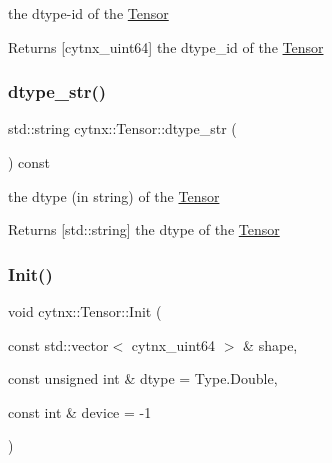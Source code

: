the dtype-\/id of the \hyperlink{classcytnx_1_1Tensor}{Tensor} 

\begin{DoxyReturn}{Returns}
\mbox{[}cytnx\+\_\+uint64\mbox{]} the dtype\+\_\+id of the \hyperlink{classcytnx_1_1Tensor}{Tensor} 
\end{DoxyReturn}
\mbox{\label{classcytnx_1_1Tensor_a9e09106c7529e8be90caa52e1541e498}} 
\subsubsection{\texorpdfstring{dtype\+\_\+str()}{dtype\_str()}}
{\footnotesize\ttfamily std\+::string cytnx\+::\+Tensor\+::dtype\+\_\+str (\begin{DoxyParamCaption}{ }\end{DoxyParamCaption}) const\hspace{0.3cm}{\ttfamily [inline]}}



the dtype (in string) of the \hyperlink{classcytnx_1_1Tensor}{Tensor} 

\begin{DoxyReturn}{Returns}
\mbox{[}std\+::string\mbox{]} the dtype of the \hyperlink{classcytnx_1_1Tensor}{Tensor} 
\end{DoxyReturn}
\mbox{\label{classcytnx_1_1Tensor_afdb4470e0dc934964d80aa9c761cca48}} 
\subsubsection{\texorpdfstring{Init()}{Init()}}
{\footnotesize\ttfamily void cytnx\+::\+Tensor\+::\+Init (\begin{DoxyParamCaption}\item[{const std\+::vector$<$ cytnx\+\_\+uint64 $>$ \&}]{shape,  }\item[{const unsigned int \&}]{dtype = {\ttfamily Type.Double},  }\item[{const int \&}]{device = {\ttfamily -\/1} }\end{DoxyParamCaption})\hspace{0.3cm}{\ttfamily [inline]}}



